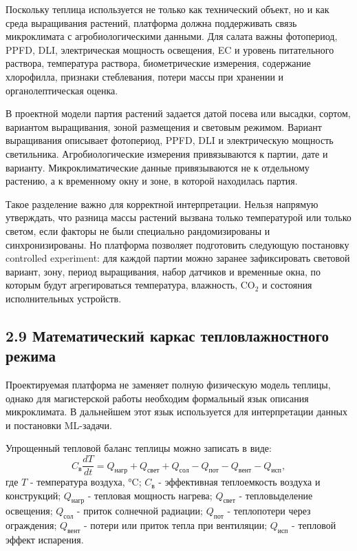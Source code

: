 \documentclass[a4paper,14pt]{extarticle}
\begin{document}
Поскольку теплица используется не только как технический объект, но и
как среда выращивания растений, платформа должна поддерживать связь
микроклимата с агробиологическими данными. Для салата важны фотопериод,
PPFD, DLI, электрическая мощность освещения, EC и уровень питательного
раствора, температура раствора, биометрические измерения, содержание
хлорофилла, признаки стеблевания, потери массы при хранении и
органолептическая оценка.

В проектной модели партия растений задается датой посева или высадки,
сортом, вариантом выращивания, зоной размещения и световым режимом.
Вариант выращивания описывает фотопериод, PPFD, DLI и электрическую
мощность светильника. Агробиологические измерения привязываются к
партии, дате и варианту. Микроклиматические данные привязываются не к
отдельному растению, а к временному окну и зоне, в которой находилась
партия.

Такое разделение важно для корректной интерпретации. Нельзя напрямую
утверждать, что разница массы растений вызвана только температурой или
только светом, если факторы не были специально рандомизированы и
синхронизированы. Но платформа позволяет подготовить следующую
постановку controlled experiment: для каждой партии можно заранее
зафиксировать световой вариант, зону, период выращивания, набор датчиков
и временные окна, по которым будут агрегироваться температура,
влажность, CO\(_2\) и состояния исполнительных устройств.

\hypertarget{ux43cux430ux442ux435ux43cux430ux442ux438ux447ux435ux441ux43aux438ux439-ux43aux430ux440ux43aux430ux441-ux442ux435ux43fux43bux43eux432ux43bux430ux436ux43dux43eux441ux442ux43dux43eux433ux43e-ux440ux435ux436ux438ux43cux430}{%
\subsection{2.9 Математический каркас тепловлажностного
режима}\label{ux43cux430ux442ux435ux43cux430ux442ux438ux447ux435ux441ux43aux438ux439-ux43aux430ux440ux43aux430ux441-ux442ux435ux43fux43bux43eux432ux43bux430ux436ux43dux43eux441ux442ux43dux43eux433ux43e-ux440ux435ux436ux438ux43cux430}}

Проектируемая платформа не заменяет полную физическую модель теплицы,
однако для магистерской работы необходим формальный язык описания
микроклимата. В дальнейшем этот язык используется для интерпретации
данных и постановки ML-задачи.

Упрощенный тепловой баланс теплицы можно записать в виде:
\begin{equation}
C_{\text{в}} \frac{dT}{dt} = Q_{\text{нагр}} + Q_{\text{свет}} + Q_{\text{сол}} - Q_{\text{пот}} - Q_{\text{вент}} - Q_{\text{исп}},
\tag{2.1}
\end{equation}
где \(T\) - температура воздуха, °C; \(C_{\text{в}}\) - эффективная
теплоемкость воздуха и конструкций; \(Q_{\text{нагр}}\) - тепловая
мощность нагрева; \(Q_{\text{свет}}\) - тепловыделение освещения;
\(Q_{\text{сол}}\) - приток солнечной радиации; \(Q_{\text{пот}}\) -
теплопотери через ограждения; \(Q_{\text{вент}}\) - потери или приток
тепла при вентиляции; \(Q_{\text{исп}}\) - тепловой эффект испарения.
\end{document}
